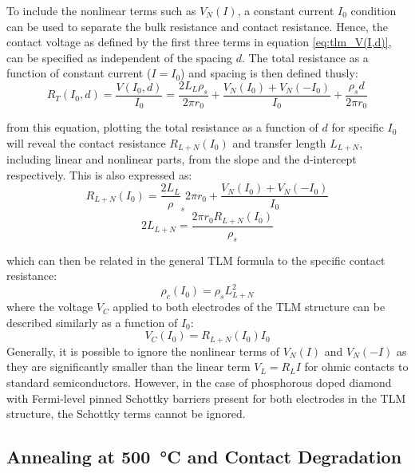 To include the nonlinear terms such as $V_{N}(I)$, a constant current $I_{0}$ condition can be used to separate the bulk resistance and contact resistance. Hence, the contact voltage as defined by the first three terms in equation \ref{eq:tlm_V(I,d)}, can be specified as independent of the spacing $d$. The total resistance as a function of constant current ($I=I_{0}$) and spacing is then defined thusly:
\begin{equation}
    R_{T}(I_{0},d) = \frac{V(I_{0},d)}{I_{0}} = \frac{2L_{L}\rho_{s}}{2\pi r_{0}} + \frac{V_{N}(I_{0}) + V_{N}(-I_{0})}{I_{0}} + \frac{\rho_{s}d}{2\pi r_{0}}
    \label{eq:tlm_R(I,d)}
\end{equation}

from this equation, plotting the total resistance as a function of $d$ for specific $I_{0}$ will reveal the contact resistance $R_{L+N}(I_{0})$ and transfer length $L_{L+N}$, including linear and nonlinear parts, from the slope and the d-intercept respectively. This is also expressed as:
\begin{equation}
    R_{L+N}(I_{0}) = \frac{2L_{L}}\rho_{s}{2\pi r_{0}} + \frac{V_{N}(I_{0}) + V_{N}(-I_{0})}{I_{0}}
    \label{eq:tlm_contact_resistance_R_L+N}
\end{equation}
\begin{equation}
    2L_{L+N} = \frac{2\pi r_{0} R_{L+N}(I_{0})}{\rho_{s}}
    \label{eq:tlm_transfer_length_L_L+N}
\end{equation}

which can then be related in the general TLM formula to the specific contact resistance:
\begin{equation}
    \rho_{c}(I_{0}) = \rho_{s}L_{L+N}^{2}
    \label{eq:tlm_specific_contact_resistance_transfer_length_L+N}
\end{equation}
where the voltage $V_{C}$ applied to both electrodes of the TLM structure can be described similarly as a function of $I_{0}$:
\begin{equation}
    V_{C}(I_{0}) = R_{L+N}(I_{0})I_{0}
    \label{eq:tlm_voltage_V_C(I_0)}
\end{equation}
Generally, it is possible to ignore the nonlinear terms of $V_{N}(I)$ and $V_{N}(-I)$ as they are significantly smaller than the linear term $V_{L} = R_{L}I$ for ohmic contacts to standard semiconductors. However, in the case of phosphorous doped diamond with Fermi-level pinned Schottky barriers present for both electrodes in the TLM structure, the Schottky terms cannot be ignored.

\subsection{Annealing at \SI{500}{\celsius} and Contact Degradation}
